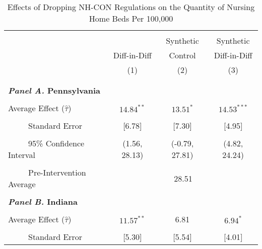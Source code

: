 \documentclass[../Main.tex]{subfiles}
\begin{document}
\newpage
\null
\vfill
\begin{table}[htbp]\centering \footnotesize
\def\sym#1{\ifmmode^{#1}\else\(^{#1}\)\fi}
\captionsetup{width=.75\textwidth}
\caption{\centering Effects of Dropping NH-CON Regulations on the Quantity of Nursing Home Beds Per 100,000}
\label{tab:ave_results_q_nhb_nobord_nocov}
\setlength{\tabcolsep}{10pt}
\begin{tabular}{l*{3}{c}}
\hline\hline
\\[-2ex]
&\multicolumn{1}{c}{}&\multicolumn{1}{c}{Synthetic}&\multicolumn{1}{c}{Synthetic}\\
&\multicolumn{1}{c}{Diff-in-Diff}&\multicolumn{1}{c}{Control}&\multicolumn{1}{c}{Diff-in-Diff}\\
&\multicolumn{1}{c}{(1)}&\multicolumn{1}{c}{(2)}&\multicolumn{1}{c}{(3)}\\
\\[-2ex]
\hline
\\[-.1ex]
\multicolumn{4}{l}{\textbf{\textit{Panel A.} Pennsylvania}}\\
\\[-1.5ex]
\multicolumn{1}{l}{Average Effect ($\hat{\tau}$)}&   \multicolumn{1}{c}{$14.84^{**}$}&   \multicolumn{1}{c}{$13.51^{*}$}&  \multicolumn{1}{c}{$14.53^{***}$}\\
\\[-2ex]
\multicolumn{1}{l}{\ \ \ \ \ Standard Error}  &\multicolumn{1}{c}{[6.78]}&\multicolumn{1}{c}{[7.30]}&\multicolumn{1}{c}{[4.95]}\\
\\[-2ex]
\multicolumn{1}{l}{\ \ \ \ \ 95\% Confidence Interval}&   \multicolumn{1}{c}{(1.56, 28.13)}&   \multicolumn{1}{c}{(-0.79, 27.81)}&   \multicolumn{1}{c}{(4.82, 24.24)}\\
\\[-2ex]
\multicolumn{1}{l}{\ \ \ \ \ Pre-Intervention Average}&   \multicolumn{3}{c}{28.51}\\
\\[-.1ex]
\multicolumn{4}{l}{\textbf{\textit{Panel B.} Indiana}}\\
\\[-1.5ex]
\multicolumn{1}{l}{Average Effect ($\hat{\tau}$)}&   \multicolumn{1}{c}{$11.57^{**}$}&   \multicolumn{1}{c}{6.81} &  \multicolumn{1}{c}{$6.94^{*}$}\\
\\[-2ex]
\multicolumn{1}{l}{\ \ \ \ \ Standard Error}  &\multicolumn{1}{c}{[5.30]}&\multicolumn{1}{c}{[5.54]}&\multicolumn{1}{c}{[4.01]}\\

\end{tabular}
\end{table}
\end{document}
